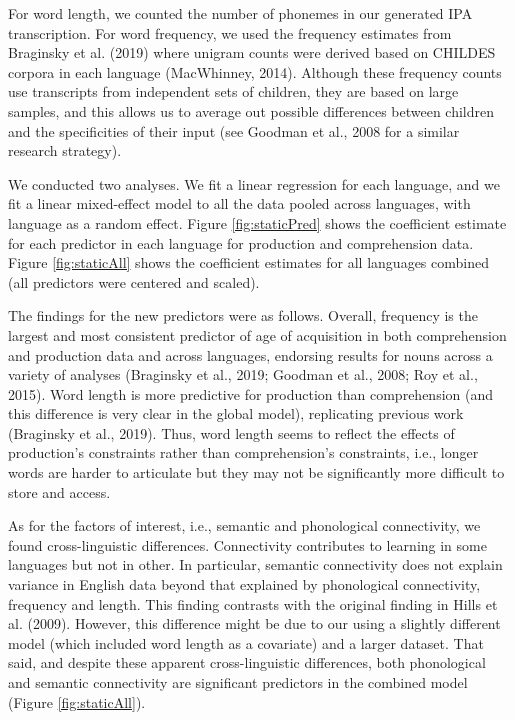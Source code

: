 \documentclass[english,,man,floatsintext]{apa6}
\begin{document}
For word length, we counted the number of phonemes in our generated IPA transcription. For word frequency, we used the frequency estimates from Braginsky et al. (2019) where unigram counts were derived based on CHILDES corpora in each language (MacWhinney, 2014). Although these frequency counts use transcripts from independent sets of children, they are based on large samples, and this allows us to average out possible differences between children and the specificities of their input (see Goodman et al., 2008 for a similar research strategy).

We conducted two analyses. We fit a linear regression for each language, and we fit a linear mixed-effect model to all the data pooled across languages, with language as a random effect. Figure \ref{fig:staticPred} shows the coefficient estimate for each predictor in each language for production and comprehension data. Figure \ref{fig:staticAll} shows the coefficient estimates for all languages combined (all predictors were centered and scaled).

The findings for the new predictors were as follows. Overall, frequency is the largest and most consistent predictor of age of acquisition in both comprehension and production data and across languages, endorsing results for nouns across a variety of analyses (Braginsky et al., 2019; Goodman et al., 2008; Roy et al., 2015). Word length is more predictive for production than comprehension (and this difference is very clear in the global model), replicating previous work (Braginsky et al., 2019). Thus, word length seems to reflect the effects of production's constraints rather than comprehension's constraints, i.e., longer words are harder to articulate but they may not be significantly more difficult to store and access.

As for the factors of interest, i.e., semantic and phonological connectivity, we found cross-linguistic differences. Connectivity contributes to learning in some languages but not in other. In particular, semantic connectivity does not explain variance in English data beyond that explained by phonological connectivity, frequency and length. This finding contrasts with the original finding in Hills et al. (2009). However, this difference might be due to our using a slightly different model (which included word length as a covariate) and a larger dataset. That said, and despite these apparent cross-linguistic differences, both phonological and semantic connectivity are significant predictors in the combined model (Figure \ref{fig:staticAll}).
\end{document}
